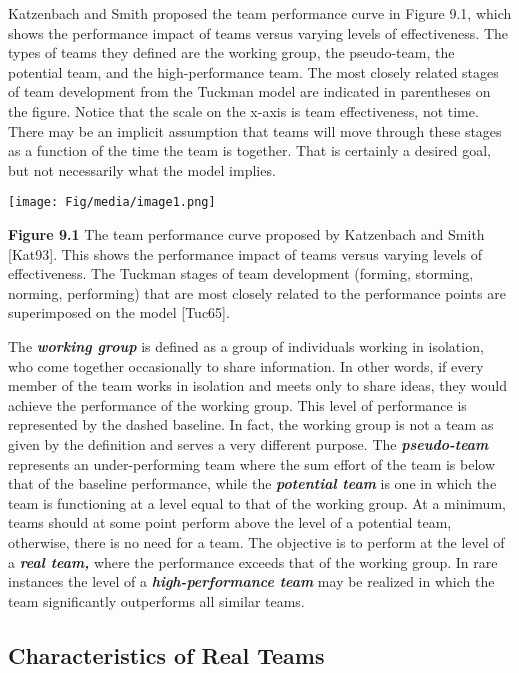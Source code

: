 Katzenbach and Smith proposed the team performance curve in Figure 9.1,
which shows the performance impact of teams versus varying levels of
effectiveness. The types of teams they defined are the working group,
the pseudo-team, the potential team, and the high-performance team. The
most closely related stages of team development from the Tuckman model
are indicated in parentheses on the figure. Notice that the scale on the
x-axis is team effectiveness, not time. There may be an implicit
assumption that teams will move through these stages as a function of
the time the team is together. That is certainly a desired goal, but not
necessarily what the model implies.

\texttt{[image: Fig/media/image1.png]}

\textbf{Figure 9.1} The team performance curve proposed by Katzenbach
and Smith {[}Kat93{]}. This shows the performance impact of teams versus
varying levels of effectiveness. The Tuckman stages of team development
(forming, storming, norming, performing) that are most closely related
to the performance points are superimposed on the model {[}Tuc65{]}.

The \emph{\textbf{working group}} is defined as a group of individuals
working in isolation, who come together occasionally to share
information. In other words, if every member of the team works in
isolation and meets only to share ideas, they would achieve the
performance of the working group. This level of performance is
represented by the dashed baseline. In fact, the working group is not a
team as given by the definition and serves a very different purpose. The
\emph{\textbf{pseudo-team}} represents an under-performing team where
the sum effort of the team is below that of the baseline performance,
while the \emph{\textbf{potential team}} is one in which the team is
functioning at a level equal to that of the working group. At a minimum,
teams should at some point perform above the level of a potential team,
otherwise, there is no need for a team. The objective is to perform at
the level of a \emph{\textbf{real team,}} where the performance exceeds
that of the working group. In rare instances the level of a
\emph{\textbf{high-performance team}} may be realized in which the team
significantly outperforms all similar teams.

\subsection{Characteristics of Real
Teams}\label{characteristics-of-real-teams}

